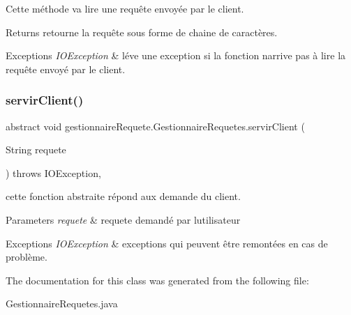 Cette méthode va lire une requête envoyée par le client. 

\begin{DoxyReturn}{Returns}
retourne la requête sous forme de chaine de caractères. 
\end{DoxyReturn}

\begin{DoxyExceptions}{Exceptions}
{\em I\+O\+Exception} & léve une exception si la fonction n\textquotesingle{}arrive pas à lire la requête envoyé par le client. \\
\hline
\end{DoxyExceptions}
\mbox{\label{classgestionnaireRequete_1_1GestionnaireRequetes_a703068945b171f22015fb5cc1f880190}} 
\subsubsection{\texorpdfstring{servir\+Client()}{servirClient()}}
{\footnotesize\ttfamily abstract void gestionnaire\+Requete.\+Gestionnaire\+Requetes.\+servir\+Client (\begin{DoxyParamCaption}\item[{String}]{requete }\end{DoxyParamCaption}) throws I\+O\+Exception\hspace{0.3cm}{\ttfamily [abstract]}, {\ttfamily [protected]}}



cette fonction abstraite répond aux demande du client. 


\begin{DoxyParams}{Parameters}
{\em requete} & requete demandé par l\textquotesingle{}utilisateur \\
\hline
\end{DoxyParams}

\begin{DoxyExceptions}{Exceptions}
{\em I\+O\+Exception} & exceptions qui peuvent être remontées en cas de problème. \\
\hline
\end{DoxyExceptions}


The documentation for this class was generated from the following file\+:\begin{DoxyCompactItemize}
\item 
Gestionnaire\+Requetes.\+java\end{DoxyCompactItemize}
